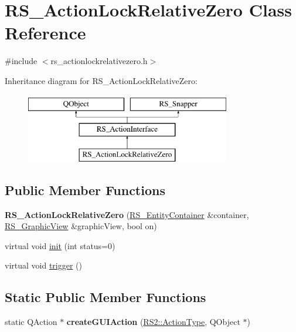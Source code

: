 \hypertarget{classRS__ActionLockRelativeZero}{\section{R\-S\-\_\-\-Action\-Lock\-Relative\-Zero Class Reference}
\label{classRS__ActionLockRelativeZero}
}


{\ttfamily \#include $<$rs\-\_\-actionlockrelativezero.\-h$>$}

Inheritance diagram for R\-S\-\_\-\-Action\-Lock\-Relative\-Zero\-:\begin{figure}[H]
\begin{center}
\leavevmode
\includegraphics[height=3.000000cm]{classRS__ActionLockRelativeZero}
\end{center}
\end{figure}
\subsection*{Public Member Functions}
\begin{DoxyCompactItemize}
\item 
\hypertarget{classRS__ActionLockRelativeZero_aaab8824c1587a38f195379f8e1090769}{{\bfseries R\-S\-\_\-\-Action\-Lock\-Relative\-Zero} (\hyperlink{classRS__EntityContainer}{R\-S\-\_\-\-Entity\-Container} \&container, \hyperlink{classRS__GraphicView}{R\-S\-\_\-\-Graphic\-View} \&graphic\-View, bool on)}\label{classRS__ActionLockRelativeZero_aaab8824c1587a38f195379f8e1090769}

\item 
virtual void \hyperlink{classRS__ActionLockRelativeZero_a1ffe41cc282930c64ee6114050c2b6f7}{init} (int status=0)
\item 
virtual void \hyperlink{classRS__ActionLockRelativeZero_acde08a5844b9d8a31be2365bee9994e6}{trigger} ()
\end{DoxyCompactItemize}
\subsection*{Static Public Member Functions}
\begin{DoxyCompactItemize}
\item 
\hypertarget{classRS__ActionLockRelativeZero_a9307a6be98bde90f8d7369817d088894}{static Q\-Action $\ast$ {\bfseries create\-G\-U\-I\-Action} (\hyperlink{classRS2_afe3523e0bc41fd637b892321cfc4b9d7}{R\-S2\-::\-Action\-Type}, Q\-Object $\ast$)}\label{classRS__ActionLockRelativeZero_a9307a6be98bde90f8d7369817d088894}

\end{DoxyCompactItemize}
